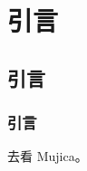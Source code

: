 \documentclass{pkuthesis}
\begin{document}
\section{引言}
\subsection{引言}
\subsubsection{引言}
去看 Mujica\cite{noauthor_bang_2025}。
\printbibliography
\end{document}
